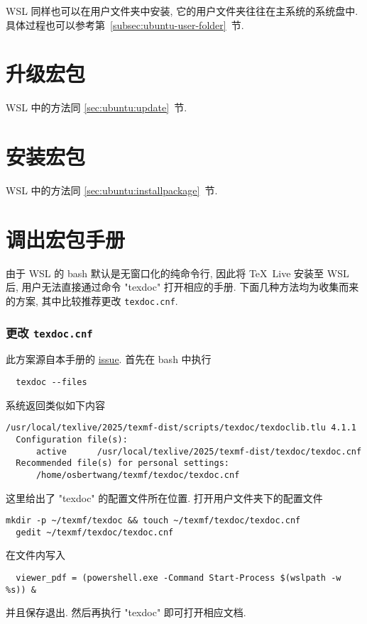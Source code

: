 WSL 同样也可以在用户文件夹中安装,
它的用户文件夹往往在主系统的系统盘中.
具体过程也可以参考第~\ref{subsec:ubuntu-user-folder}~节.

\section{升级宏包}

WSL 中的方法同 \ref{sec:ubuntu:update}~节.

\section{安装宏包}

WSL 中的方法同 \ref{sec:ubuntu:installpackage}~节.

\section{调出宏包手册}

由于 WSL 的 \textsf{bash} 默认是无窗口化的纯命令行,
因此将 \TeX~Live 安装至 WSL 后,
用户无法直接通过命令 "texdoc" 打开相应的手册.
下面几种方法均为收集而来的方案,
其中比较推荐更改 \texttt{texdoc.cnf}.

\subsubsection{更改 \texttt{texdoc.cnf}}

此方案源自本手册的 \href{https://github.com/OsbertWang/install-latex-guide-zh-cn/issues/13}{issue}.
首先在 \textsf{bash} 中执行
\begin{lstlisting}
  texdoc --files
\end{lstlisting}
系统返回类似如下内容
\begin{lstlisting}[language = {}]
  /usr/local/texlive/2025/texmf-dist/scripts/texdoc/texdoclib.tlu 4.1.1
  Configuration file(s):
      active      /usr/local/texlive/2025/texmf-dist/texdoc/texdoc.cnf
  Recommended file(s) for personal settings:
      /home/osbertwang/texmf/texdoc/texdoc.cnf
\end{lstlisting}
这里给出了 "texdoc" 的配置文件所在位置.
打开用户文件夹下的配置文件
\begin{lstlisting}[deletekeywords = texdoc]
  mkdir -p ~/texmf/texdoc && touch ~/texmf/texdoc/texdoc.cnf
  gedit ~/texmf/texdoc/texdoc.cnf
\end{lstlisting}
在文件内写入
\begin{lstlisting}
  viewer_pdf = (powershell.exe -Command Start-Process $(wslpath -w %s)) &
\end{lstlisting}
并且保存退出.
然后再执行 "texdoc" 即可打开相应文档.

